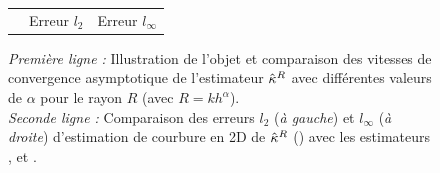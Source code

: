 \begin{figure}[ht]
\begin{center}
\begin{tabular}{@{}l c c @{}}
      \\
      &
      Erreur $l_2$ &
      Erreur $l_\infty$
    \end{tabular}
    \caption[Évaluation expérimentale sur l'objet \AccFlower.]{
      \emph{Première ligne :} Illustration de l'objet \AccFlower et comparaison
      des vitesses de convergence asymptotique de l'estimateur $\hat{\kappa}^{R}$ avec
      différentes valeurs de $\alpha$ pour le rayon $R$ (avec $R=kh^\alpha$).
      \\
      \emph{Seconde ligne :} Comparaison des erreurs $l_2$ (\emph{à gauche}) et
      $l_\infty$ (\emph{à droite}) d'estimation de courbure en 2D de $\hat{\kappa}^{R}$
      (\II) avec les estimateurs \BC \cite{Esbelin2011}, \MDSS
      \cite{Coeurjolly2001,deVieilleville2007} et \MDCA \cite{Roussillon2011}.
      }
      \label{fig:curv-experiments-accflower}
  \end{center}
\end{figure}
%
